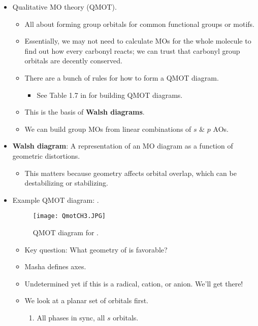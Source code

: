 \documentclass[../notes.tex]{subfiles}
\begin{document}
\begin{itemize}
\begin{itemize}
    \end{itemize}
    \item Qualitative MO theory (QMOT).
    \begin{itemize}
        \item All about forming group orbitals for common functional groups or motifs.
        \item Essentially, we may not need to calculate MOs for the whole molecule to find out how every carbonyl reacts; we can trust that carbonyl group orbitals are decently conserved.
        \item There are a bunch of rules for how to form a QMOT diagram.
        \begin{itemize}
            \item See Table 1.7 in \textcite{bib:Anslyn} for building QMOT diagrams.
        \end{itemize}
        \item This is the basis of \textbf{Walsh diagrams}.
        \item We can build group MOs from linear combinations of $s$ \& $p$ AOs.
    \end{itemize}
    \item \textbf{Walsh diagram}: A representation of an MO diagram as a function of geometric distortions.
    \begin{itemize}
        \item This matters because geometry affects orbital overlap, which can be destabilizing or stabilizing.
    \end{itemize}
    \pagebreak
    \item Example QMOT diagram: .
    \begin{figure}[h!]
        \centering
        \texttt{[image: QmotCH3.JPG]}
        \caption{QMOT diagram for .}
        \label{fig:QmotCH3}
    \end{figure}
    \begin{itemize}
        \item Key question: What geometry of  is favorable?
        \item Masha defines axes.
        \item Undetermined yet if this is a radical, cation, or anion. We'll get there!
        \item We look at a planar set of orbitals first.
        \begin{enumerate}[label={\textbf{\Alph*}.}]
            \item All phases in sync, all $s$ orbitals.

\end{enumerate}
\end{itemize}
\end{itemize}
\end{document}
